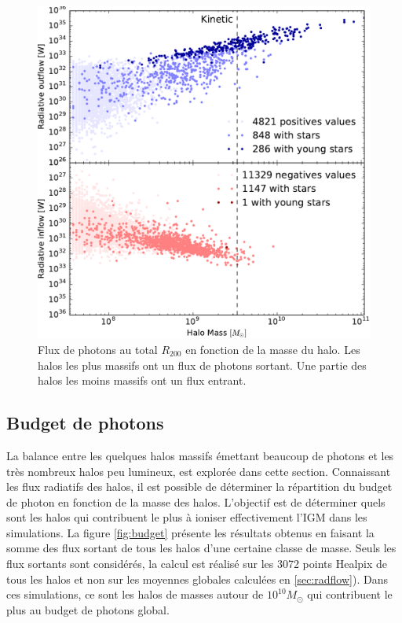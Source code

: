 \begin{figure}
	\includegraphics[height=.30\textheight]{img/03/flux_rad_kinetic.pdf} 
    \caption[Flux de photons au $R_{200}$]{Flux de photons au total $R_{200}$ en fonction de la masse du halo. 
    Les halos les plus massifs ont un flux de photons sortant. 
    Une partie des halos les moins massifs ont un flux entrant.}
 	\label{fig:R200rad}
\end{figure}


\subsection{Budget de photons}

La balance entre les quelques halos massifs émettant beaucoup de photons et les très nombreux halos peu lumineux, est explorée dans cette section.
Connaissant les flux radiatifs des halos, il est possible de déterminer la répartition du budget de photon en fonction de la masse des halos.
L'objectif est de déterminer quels sont les halos qui contribuent le plus à ioniser effectivement l'\ac{IGM} dans les simulations.
La figure \ref{fig:budget} présente les résultats obtenus en faisant la somme des flux sortant de tous les halos d'une certaine classe de masse.
Seuls les flux sortants sont considérés, la calcul est réalisé sur les 3072 points Healpix de tous les halos et non sur les moyennes globales calculées en \ref{sec:radflow}).
Dans ces simulations, ce sont les halos de masses autour de $10^{10} M_\odot$ qui contribuent le plus au budget de photons global.

